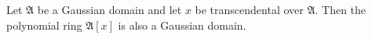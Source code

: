 Let $\mathfrak{A}$ be a Gaussian domain and let $x$ be transcendental over $\mathfrak{A}$. Then the polynomial ring $\mathfrak{A}[x]$ is also a Gaussian domain.
